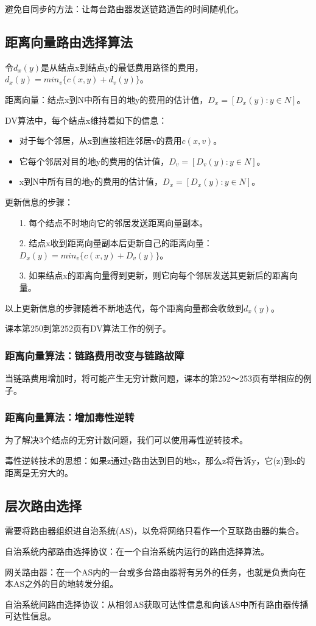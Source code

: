 \documentclass[a4paper,left=2.5cm,right=2.5cm,11pt]{article}
\begin{document}
	避免自同步的方法：让每台路由器发送链路通告的时间随机化。

\subsection{距离向量路由选择算法}
	令$d_x(y)$是从结点x到结点y的最低费用路径的费用，$d_x(y)=min_v\{c(x,y)+d_v(y)\}$。\par

	距离向量：结点x到N中所有目的地y的费用的估计值，$D_x=[D_x(y):y\in N]$。\par

	DV算法中，每个结点x维持着如下的信息：
	\begin{itemize}
		\item 对于每个邻居，从x到直接相连邻居v的费用$c(x,v)$。
		\item 它每个邻居对目的地y的费用的估计值，$D_v=[D_v(y):y\in N]$。
		\item x到N中所有目的地y的费用的估计值，$D_x=[D_x(y):y\in N]$。
	\end{itemize}

	更新信息的步骤：
	\begin{itemize}
		\item[1.] 每个结点不时地向它的邻居发送距离向量副本。
		\item[2.] 结点x收到距离向量副本后更新自己的距离向量：$D_x(y)=min_v\{c(x,y)+D_v(y)\}$。
		\item[3.] 如果结点x的距离向量得到更新，则它向每个邻居发送其更新后的距离向量。
	\end{itemize}

	以上更新信息的步骤随着不断地迭代，每个距离向量都会收敛到$d_x(y)$。\par

	课本第250到第252页有DV算法工作的例子。

\subsubsection{距离向量算法：链路费用改变与链路故障}
	当链路费用增加时，将可能产生无穷计数问题，课本的第252～253页有举相应的例子。\par

\subsubsection{距离向量算法：增加毒性逆转}
	为了解决3个结点的无穷计数问题，我们可以使用毒性逆转技术。\par

	毒性逆转技术的思想：如果z通过y路由达到目的地x，那么z将告诉y，它(z)到x的距离是无穷大的。

\subsection{层次路由选择}
	需要将路由器组织进自治系统(AS)，以免将网络只看作一个互联路由器的集合。\par

	自治系统内部路由选择协议：在一个自治系统内运行的路由选择算法。\par

	网关路由器：在一个AS内的一台或多台路由器将有另外的任务，也就是负责向在本AS之外的目的地转发分组。\par

	自治系统间路由选择协议：从相邻AS获取可达性信息和向该AS中所有路由器传播可达性信息。
\end{document}

